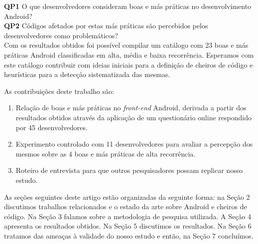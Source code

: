 \textbf{QP1} O que desenvolvedores consideram boas e más práticas no desenvolvimento Android? \\

\textbf{QP2} Códigos afetados por estas más práticas são percebidos pelos desenvolvedores como problemáticos? \\

Com os resultados obtidos foi possível compilar um catálogo com 23 boas e más práticas Android classificadas em alta, média e baixa recorrência. Esperamos com este catálogo contribuir com ideias iniciais para a definição de cheiros de código e heurísticas para a detecção sistematizada das mesmas.

As contribuições deste trabalho são:

\begin{enumerate}

	\item Relação de boas e más práticas no \textit{front-end} Android, derivada a partir dos resultados obtidos através da aplicação de um questionário online respondido por 45 desenvolvedores.

	\item Experimento controlado com 11 desenvolvedores para avaliar a percepção dos mesmos sobre as 4 boas e más práticas de alta recorrência.

	\item Roteiro de entrevista para que outros pesquisadores possam replicar nosso estudo.
\end{enumerate}

As seções seguintes deste artigo estão organizadas da seguinte forma: na Seção 2 discutimos trabalhos relacionados e o estado da arte sobre Android e cheiros de código. Na Seção 3 falamos sobre a metodologia de pesquisa utilizada. A Seção 4 apresenta os resultados obtidos. Na Seção 5 discutimos os resultados. Na Seção 6 tratamos das ameaças à validade do nosso estudo e então, na Seção 7 concluímos.
